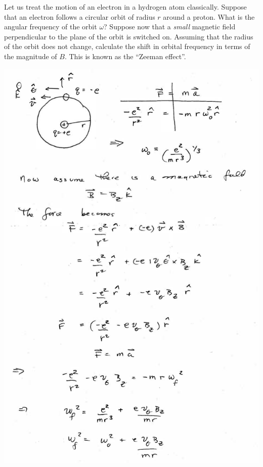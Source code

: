\documentclass[makesolutionspdf]{esg8022pset}
\begin{document}
\begin{problem}{}
  Let us treat the motion of an electron in a hydrogen atom classically. Suppose that an electron follows a circular orbit of radius $r$ around a proton. What is the angular frequency of the orbit $\omega$? Suppose now that a \emph{small} magnetic field perpendicular to the plane of the orbit is switched on. Assuming that the radius of the orbit does not change, calculate the shift in orbital frequency in terms of the magnitude of $B$. This is known as the ``Zeeman effect''.
\end{problem}
\begin{solution}
  \begin{center}\includegraphics[width=\textwidth]{ps07_sol_02_1.pdf}\end{center}

\end{solution}
\end{document}
